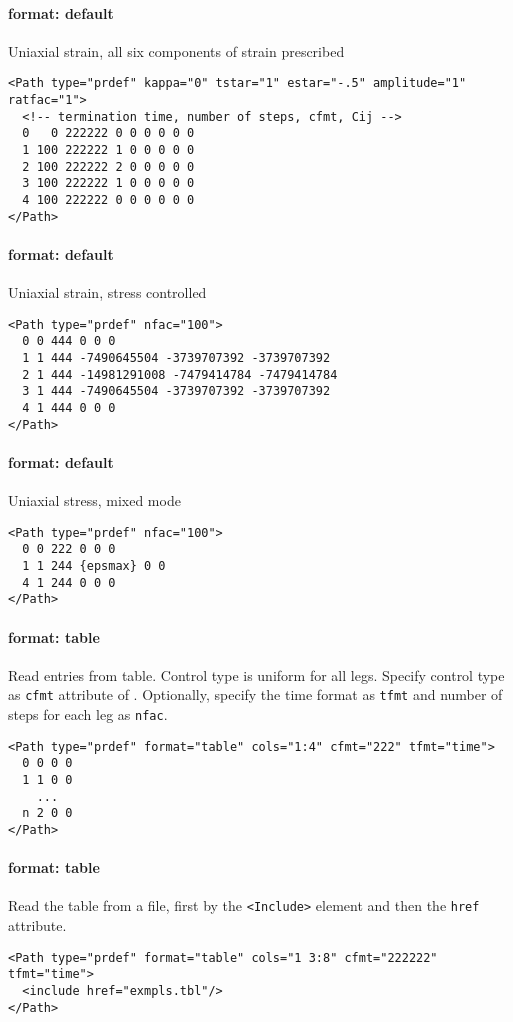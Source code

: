 \documentclass[11pt]{report}
\renewcommand{\tag}[1]{\texttt{<#1>}}
\newcommand{\reqdtag}[1]{\Red{\texttt{<#1>}}}
\begin{document}
\paragraph{format: default} Uniaxial strain, all six components of strain prescribed
\begin{verbatim}
<Path type="prdef" kappa="0" tstar="1" estar="-.5" amplitude="1" ratfac="1">
  <!-- termination time, number of steps, cfmt, Cij -->
  0   0 222222 0 0 0 0 0 0
  1 100 222222 1 0 0 0 0 0
  2 100 222222 2 0 0 0 0 0
  3 100 222222 1 0 0 0 0 0
  4 100 222222 0 0 0 0 0 0
</Path>
\end{verbatim}

\paragraph{format: default} Uniaxial strain, stress controlled
\begin{verbatim}
<Path type="prdef" nfac="100">
  0 0 444 0 0 0
  1 1 444 -7490645504 -3739707392 -3739707392
  2 1 444 -14981291008 -7479414784 -7479414784
  3 1 444 -7490645504 -3739707392 -3739707392
  4 1 444 0 0 0
</Path>
\end{verbatim}

\paragraph{format: default} Uniaxial stress, mixed mode
\begin{verbatim}
<Path type="prdef" nfac="100">
  0 0 222 0 0 0
  1 1 244 {epsmax} 0 0
  4 1 244 0 0 0
</Path>
\end{verbatim}

\paragraph{format: table} Read entries from table. Control type is uniform for
all legs. Specify control type as \texttt{cfmt} attribute of \reqdtag{Path}.
Optionally, specify the time format as \texttt{tfmt} and number of steps for
each leg as \texttt{nfac}.
\begin{verbatim}
<Path type="prdef" format="table" cols="1:4" cfmt="222" tfmt="time">
  0 0 0 0
  1 1 0 0
    ...
  n 2 0 0
</Path>
\end{verbatim}

\paragraph{format: table} Read the table from a file, first by the
\tag{Include} element and then the \texttt{href} attribute.
\begin{verbatim}
<Path type="prdef" format="table" cols="1 3:8" cfmt="222222" tfmt="time">
  <include href="exmpls.tbl"/>
</Path>
\end{verbatim}
\end{document}
